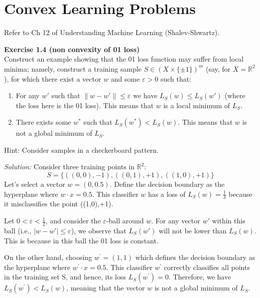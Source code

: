\documentclass[
	10pt, %
	a4paper, %
	oneside, %
	headinclude,footinclude, %
	BCOR5mm, %
]{scrartcl}
\newenvironment{problem}[2][]
{ \begin{mdframed}[backgroundcolor=gray!20] \textbf{#1 #2} \\}
		{  \end{mdframed}}
\newenvironment{solution}
{\textit{Solution:}}
{}
\begin{document}
\section{Convex Learning Problems}
Refer to Ch 12 of Understanding Machine Learning (Shalev-Shwartz).

\begin{problem}{Exercise 1.4 (non convexity of 0\textendash{}1 loss)}
Construct an example showing that the 0\textendash{}1 loss function may suffer from local minima; namely, construct a training sample $S \in {(X \times \{\pm1\})}^m$ (say, for $X = \mathbb{R}^2$), for which there exist a vector $w$ and some $\varepsilon > 0$ such that:
\begin{enumerate}

	\item For any $w'$ such that $\|w - w'\| \leq \varepsilon$ we have $L_S (w) \leq L_S (w')$ (where the loss here is the 0\textendash{}1 loss). This means that $w$ is a local minimum of $L_S$.
	\item There exists some $w^*$ such that $L_S (w^*) < L_S (w)$. This means that $w$ is not a global minimum of $L_S$.
\end{enumerate}

Hint: Consider samples in a checkerboard pattern.
\end{problem}

\begin{solution}
	Consider three training points in $\mathbb{R}^2$:
	\[
		S = \{((0,0), -1), ((0,1), +1), ((1,0), +1)\}
	\]
	Let's select a vector $w=(0,0.5)$. Define the decision boundary as the hyperplane where $w \cdot x = 0.5$. This classifier $w$ has a loss of $L_S(w) = \frac{1}{3}$ because it misclassifies the point ((1,0),+1).

	Let $0 < \varepsilon < \frac{1}{2}$, and consider the $\varepsilon$-ball around $w$. For any vector $w'$ within this ball (i.e., $|w - w'| \leq \varepsilon$), we observe that $L_S(w')$ will not be lower than $L_S(w)$. This is because in this ball the 0\textendash{}1 loss is constant.

	On the other hand, choosing $w^\prime=(1,1)$ which defines the decision boundary as the hyperplane where $w^\prime \cdot x = 0.5$. This classifier $w^\prime$ correctly classifies all points in the training set S, and hence, its loss $L_S(w^\prime) = 0$. Therefore, we have $L_S(w^\prime) < L_S(w)$, meaning that the vector $w$ is not a global minimum of $L_S$.

\end{solution}
\end{document}
